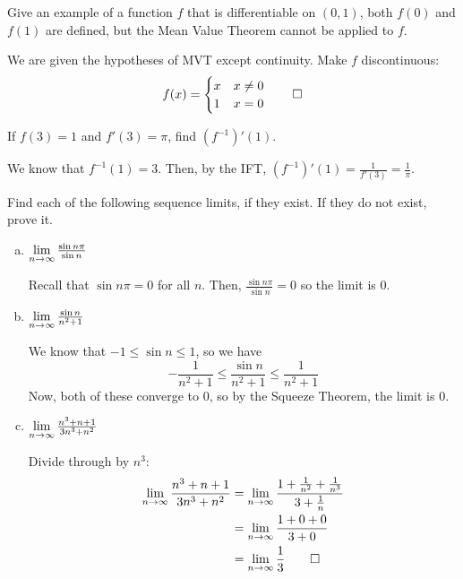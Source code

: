 \documentclass{agony}
\begin{document}
\begin{prob}
  Give an example of a function $f$ that is differentiable on $(0,1)$,
  both $f(0)$ and $f(1)$ are defined, but the Mean Value Theorem cannot be applied to $f$.
\end{prob}
\begin{sol}
  We are given the hypotheses of MVT except continuity. Make $f$ discontinuous:
  \[ f(x) = \begin{cases}
      x & x \neq 0 \\
      1 & x = 0
    \end{cases} \qedhere \]
\end{sol}

\begin{prob} If $f(3) = 1$ and $f'(3) = \pi$, find $(f^{-1})'(1)$. \end{prob}
\begin{sol}
  We know that $f^{-1}(1) = 3$.
  Then, by the IFT, $(f^{-1})'(1) = \frac{1}{f'(3)} = \frac{1}{\pi}$.
\end{sol}



\begin{prob}
  Find each of the following sequence limits, if they exist.
  If they do not exist, prove it.
  \begin{enumerate}[(a)]
    \item $\lim\limits_{n\to\infty} \frac{\sin n\pi}{\sin n}$
          \begin{sol}
            Recall that $\sin n\pi = 0$ for all $n$.
            Then, $\frac{\sin n\pi}{\sin n} = 0$ so the limit is 0.
          \end{sol}
    \item $\lim\limits_{n\to\infty} \frac{\sin n}{n^2+1}$
          \begin{sol}
            We know that $-1 \leq \sin n \leq 1$, so we have
            \[ -\frac{1}{n^2+1} \leq \frac{\sin n}{n^2+1} \leq \frac{1}{n^2+1} \]
            Now, both of these converge to 0, so by the Squeeze Theorem, the limit is 0.
          \end{sol}
    \item $\lim\limits_{n\to\infty} \frac{n^3+n+1}{3n^3+n^2}$
          \begin{sol}
            Divide through by $n^3$: \begin{align*}
              \lim_{n\to\infty} \frac{n^3+n+1}{3n^3+n^2}
               & = \lim_{n\to\infty} \frac{1+\frac{1}{n^2}+\frac{1}{n^3}}{3+\frac{1}{n}} \\
               & = \lim_{n\to\infty} \frac{1+0+0}{3+0}                                   \\
               & = \lim_{n\to\infty} \frac{1}{3} \qedhere
            \end{align*}
          \end{sol}
  \end{enumerate}
\end{prob}
\end{document}
